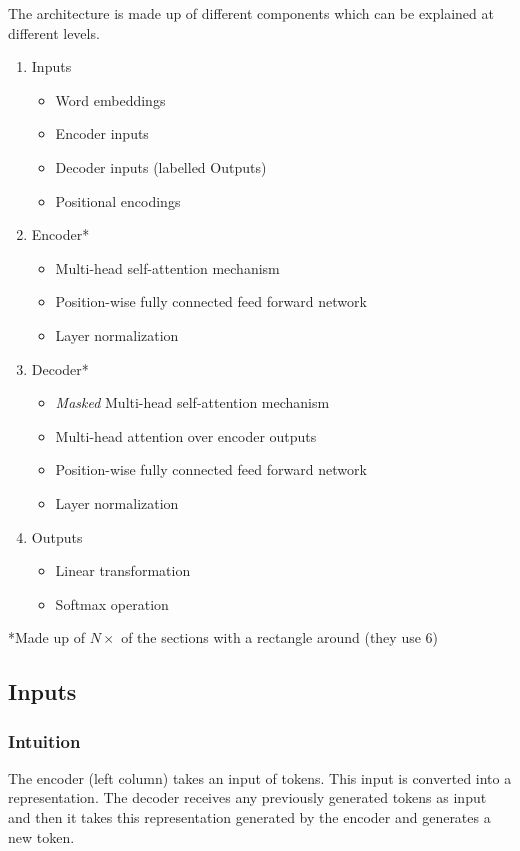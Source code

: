 \documentclass{article}
\begin{document}
    The architecture is made up of different components which can be explained at different levels.
    \pagebreak
    \begin{enumerate}
        \item Inputs
        \begin{itemize}
            \item Word embeddings
            \item Encoder inputs
            \item Decoder inputs (labelled Outputs)
            \item Positional encodings
        \end{itemize}
        \item Encoder*
        \begin{itemize}
            \item Multi-head self-attention mechanism
            \item Position-wise fully connected feed forward network
            \item Layer normalization
        \end{itemize}
        \item Decoder*
        \begin{itemize}
            \item \emph{Masked} Multi-head self-attention mechanism
            \item Multi-head attention over encoder outputs
            \item Position-wise fully connected feed forward network
            \item Layer normalization
        \end{itemize}
        \item Outputs
        \begin{itemize}
            \item Linear transformation
            \item Softmax operation
        \end{itemize}
    \end{enumerate}

    *Made up of $N \times$ of the sections with a rectangle around   (they use 6)
    
    \subsection{Inputs}

    \subsubsection{Intuition} The encoder (left column) takes an input of tokens. This input is converted into a representation. The decoder receives any previously generated tokens as input and then it takes this representation generated by the encoder and generates a new token.
\end{document}
